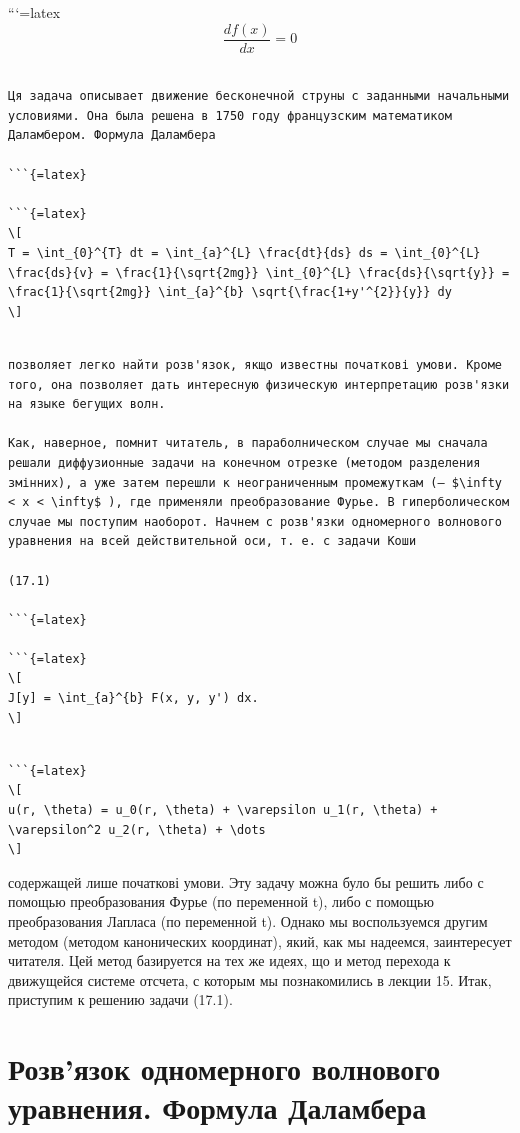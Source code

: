 \documentclass[
  ukrainian,
]{article}
\begin{document}
```{=latex}
\[
\frac{df(x)}{dx} = 0
\]

\begin{verbatim}

Ця задача описывает движение бесконечной струны с заданными начальными условиями. Она была решена в 1750 году французским математиком Даламбером. Формула Даламбера

```{=latex}

```{=latex}
\[
T = \int_{0}^{T} dt = \int_{a}^{L} \frac{dt}{ds} ds = \int_{0}^{L} \frac{ds}{v} = \frac{1}{\sqrt{2mg}} \int_{0}^{L} \frac{ds}{\sqrt{y}} = \frac{1}{\sqrt{2mg}} \int_{a}^{b} \sqrt{\frac{1+y'^{2}}{y}} dy
\]
\end{verbatim}

\begin{verbatim}

позволяет легко найти розв'язок, якщо известны початкові умови. Кроме того, она позволяет дать интересную физическую интерпретацию розв'язки на языке бегущих волн.

Как, наверное, помнит читатель, в параболническом случае мы сначала решали диффузионные задачи на конечном отрезке (методом разделения змінних), а уже затем перешли к неограниченным промежуткам (— $\infty < x < \infty$ ), где применяли преобразование Фурье. В гиперболическом случае мы поступим наоборот. Начнем с розв'язки одномерного волнового уравнения на всей действительной оси, т. е. с задачи Коши

(17.1)

```{=latex}

```{=latex}
\[
J[y] = \int_{a}^{b} F(x, y, y') dx.
\]
\end{verbatim}

\begin{verbatim}

```{=latex}
\[
u(r, \theta) = u_0(r, \theta) + \varepsilon u_1(r, \theta) + \varepsilon^2 u_2(r, \theta) + \dots
\]
\end{verbatim}

содержащей лише початкові умови. Эту задачу можна було бы решить либо с
помощью преобразования Фурье (по переменной t), либо с помощью
преобразования Лапласа (по переменной t). Однако мы воспользуемся другим
методом (методом канонических координат), який, как мы надеемся,
заинтересует читателя. Цей метод базируется на тех же идеях, що и метод
перехода к движущейся системе отсчета, с которым мы познакомились в
лекции 15. Итак, приступим к решению задачи (17.1).

\section{Розв'язок одномерного волнового уравнения. Формула
Даламбера}\label{ux440ux43eux437ux432ux44fux437ux43eux43a-ux43eux434ux43dux43eux43cux435ux440ux43dux43eux433ux43e-ux432ux43eux43bux43dux43eux432ux43eux433ux43e-ux443ux440ux430ux432ux43dux435ux43dux438ux44f.-ux444ux43eux440ux43cux443ux43bux430-ux434ux430ux43bux430ux43cux431ux435ux440ux430}
\end{document}
